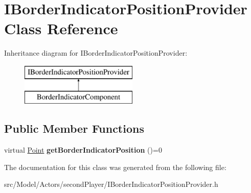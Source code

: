 \hypertarget{classIBorderIndicatorPositionProvider}{}\section{I\+Border\+Indicator\+Position\+Provider Class Reference}
\label{classIBorderIndicatorPositionProvider}
Inheritance diagram for I\+Border\+Indicator\+Position\+Provider\+:\begin{figure}[H]
\begin{center}
\leavevmode
\includegraphics[height=2.000000cm]{classIBorderIndicatorPositionProvider}
\end{center}
\end{figure}
\subsection*{Public Member Functions}
\begin{DoxyCompactItemize}
\item 
virtual \hyperlink{classPoint}{Point} {\bfseries get\+Border\+Indicator\+Position} ()=0\hypertarget{classIBorderIndicatorPositionProvider_a3a86830892aae80b3fcab12fb5f9dec3}{}\label{classIBorderIndicatorPositionProvider_a3a86830892aae80b3fcab12fb5f9dec3}

\end{DoxyCompactItemize}


The documentation for this class was generated from the following file\+:\begin{DoxyCompactItemize}
\item 
src/\+Model/\+Actors/second\+Player/I\+Border\+Indicator\+Position\+Provider.\+h\end{DoxyCompactItemize}
